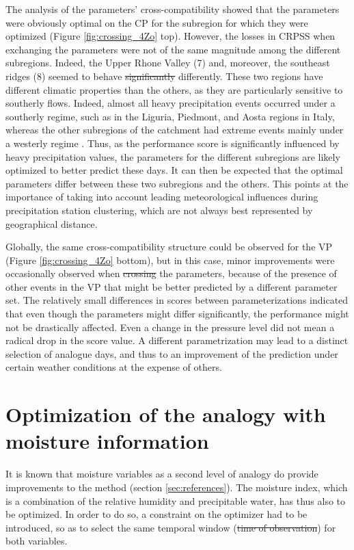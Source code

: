 \documentclass[review]{elsarticle}
\providecommand{\DIFaddtex}[1]{{\protect\color{blue}\uwave{#1}}} %
\providecommand{\DIFdeltex}[1]{{\protect\color{red}\sout{#1}}}                      %
\providecommand{\DIFaddbegin}{} %
\providecommand{\DIFaddend}{} %
\providecommand{\DIFdelbegin}{} %
\providecommand{\DIFdelend}{} %
\providecommand{\DIFadd}[1]{\texorpdfstring{\DIFaddtex{#1}}{#1}} %
\providecommand{\DIFdel}[1]{\texorpdfstring{\DIFdeltex{#1}}{}} %
\begin{document}
The analysis of the parameters’ cross-compatibility showed that the parameters were obviously optimal on the CP for the subregion for which they were optimized (Figure \ref{fig:crossing_4Zo} top). However, the losses in CRPSS when exchanging the parameters were not of the same magnitude among the different subregions. Indeed, the Upper Rhone Valley (7) and, moreover, the southeast ridges (8) seemed to behave \DIFdelbegin \DIFdel{significantly }\DIFdelend differently. These two regions have different climatic properties than the others, as they are particularly sensitive to southerly flows. Indeed, almost all heavy precipitation events occurred under a southerly regime, such as in the Liguria, Piedmont, and Aosta regions in Italy, whereas the other subregions of the catchment had extreme events mainly under a westerly regime \citep{Horton2012}. Thus, as the performance score is significantly influenced by heavy precipitation values, the parameters for the different subregions are likely optimized to better predict these days. It can then be expected that the optimal parameters differ between these two subregions and the others. This points at the importance of taking into account leading meteorological influences during precipitation station clustering, which are not always best represented by geographical distance. 

Globally, the same cross-compatibility structure could be observed for the VP (Figure \ref{fig:crossing_4Zo} bottom), but in this case, minor improvements were occasionally observed when \DIFdelbegin \DIFdel{crossing }\DIFdelend \DIFaddbegin \DIFadd{switching }\DIFaddend the parameters, because of the presence of other events in the VP that might be better predicted by a different parameter set. The relatively small differences in scores between parameterizations indicated that even though the parameters might differ significantly, the performance might not be drastically affected. Even a change in the pressure level did not mean a radical drop in the score value. A different parametrization may lead to a distinct selection of analogue days, and thus to an improvement of the prediction under certain weather conditions at the expense of others.


\section{Optimization of the analogy with moisture information}
\label{sec:optim_moisture}

It is known that moisture variables as a second level of analogy do provide improvements to the method (section \ref{sec:references}). The moisture index, which is a combination of the relative humidity and precipitable water, has thus also to be optimized. In order to do so, a constraint on the optimizer had to be introduced, so as to select the same temporal window (\DIFdelbegin \DIFdel{time of observation}\DIFdelend \DIFaddbegin \DIFadd{hour of the day}\DIFaddend ) for both variables. 
\end{document}
